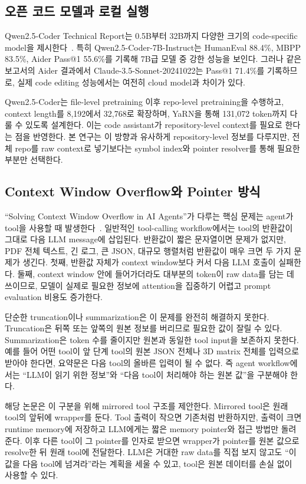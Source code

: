 \documentclass[11pt,a4paper]{article}
\begin{document}
\subsection{오픈 코드 모델과 로컬 실행}

Qwen2.5-Coder Technical Report는 0.5B부터 32B까지 다양한 크기의 code-specific model을 제시한다~\cite{hui2024qwen25coder}. 특히 Qwen2.5-Coder-7B-Instruct는 HumanEval 88.4\%, MBPP 83.5\%, Aider Pass@1 55.6\%를 기록해 7B급 모델 중 강한 성능을 보인다. 그러나 같은 보고서의 Aider 결과에서 Claude-3.5-Sonnet-20241022는 Pass@1 71.4\%를 기록하므로, 실제 code editing 성능에서는 여전히 cloud model과 차이가 있다.

Qwen2.5-Coder는 file-level pretraining 이후 repo-level pretraining을 수행하고, context length를 8,192에서 32,768로 확장하며, YaRN을 통해 131,072 token까지 다룰 수 있도록 설계한다. 이는 code assistant가 repository-level context를 필요로 한다는 점을 반영한다. 본 연구는 이 방향과 유사하게 repository-level 정보를 다루지만, 전체 repo를 raw context로 넣기보다는 symbol index와 pointer resolver를 통해 필요한 부분만 선택한다.

\subsection{Context Window Overflow와 Pointer 방식}

``Solving Context Window Overflow in AI Agents''가 다루는 핵심 문제는 agent가 tool을 사용할 때 발생한다~\cite{labate2025contextoverflow}. 일반적인 tool-calling workflow에서는 tool의 반환값이 그대로 다음 LLM message에 삽입된다. 반환값이 짧은 문자열이면 문제가 없지만, PDF 전체 텍스트, 긴 로그, 큰 JSON, 대규모 행렬처럼 반환값이 매우 크면 두 가지 문제가 생긴다. 첫째, 반환값 자체가 context window보다 커서 다음 LLM 호출이 실패한다. 둘째, context window 안에 들어가더라도 대부분의 token이 raw data를 담는 데 쓰이므로, 모델이 실제로 필요한 정보에 attention을 집중하기 어렵고 prompt evaluation 비용도 증가한다.

단순한 truncation이나 summarization은 이 문제를 완전히 해결하지 못한다. Truncation은 뒤쪽 또는 앞쪽의 원본 정보를 버리므로 필요한 값이 잘릴 수 있다. Summarization은 token 수를 줄이지만 원본과 동일한 tool input을 보존하지 못한다. 예를 들어 어떤 tool이 앞 단계 tool의 원본 JSON 전체나 3D matrix 전체를 입력으로 받아야 한다면, 요약문은 다음 tool의 올바른 입력이 될 수 없다. 즉 agent workflow에서는 ``LLM이 읽기 위한 정보''와 ``다음 tool이 처리해야 하는 원본 값''을 구분해야 한다.

해당 논문은 이 구분을 위해 mirrored tool 구조를 제안한다. Mirrored tool은 원래 tool의 앞뒤에 wrapper를 둔다. Tool 출력이 작으면 기존처럼 반환하지만, 출력이 크면 runtime memory에 저장하고 LLM에게는 짧은 memory pointer와 접근 방법만 돌려준다. 이후 다른 tool이 그 pointer를 인자로 받으면 wrapper가 pointer를 원본 값으로 resolve한 뒤 원래 tool에 전달한다. LLM은 거대한 raw data를 직접 보지 않고도 ``이 값을 다음 tool에 넘겨라''라는 계획을 세울 수 있고, tool은 원본 데이터를 손실 없이 사용할 수 있다.
\end{document}
